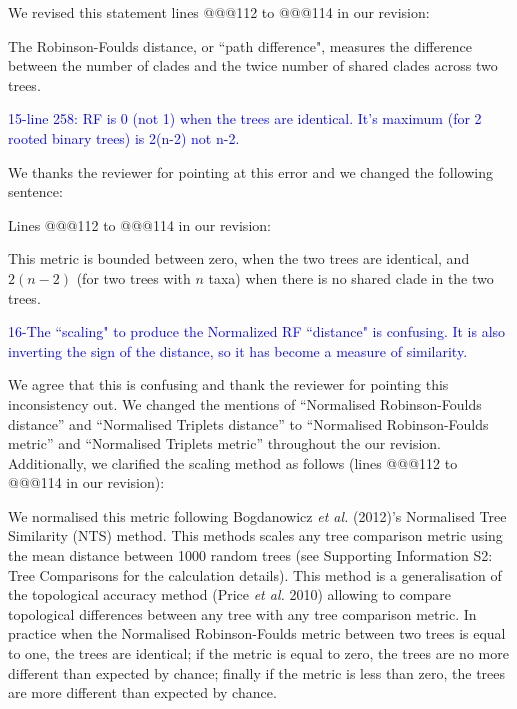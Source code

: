\documentclass[11pt]{letter}
\begin{document}
\begin{letter}{}
We revised this statement lines @@@112 to @@@114 in our revision:

\hfill\begin{minipage}{\dimexpr\textwidth-1cm}
The Robinson-Foulds distance, or ``path difference", measures the difference between the number of clades and the twice number of shared clades across two trees.
\end{minipage}


\textcolor{blue}{15-line 258: RF is 0 (not 1) when the trees are identical. It's maximum (for 2 rooted binary trees) is 2(n-2) not n-2.}

We thanks the reviewer for pointing at this error and we changed the following sentence:

Lines @@@112 to @@@114 in our revision:

\hfill\begin{minipage}{\dimexpr\textwidth-1cm}
This metric is bounded between zero, when the two trees are identical, and $2(n-2)$ (for two trees with $n$ taxa) when there is no shared clade in the two trees.
\end{minipage}


\textcolor{blue}{16-The ``scaling" to produce the Normalized RF ``distance" is confusing. It is also inverting the sign of the distance, so it has become a measure of similarity.}

We agree that this is confusing and thank the reviewer for pointing this inconsistency out. We changed the mentions of ``Normalised Robinson-Foulds distance'' and ``Normalised Triplets distance'' to ``Normalised Robinson-Foulds metric'' and ``Normalised Triplets metric'' throughout the our revision. Additionally, we clarified the scaling method as follows (lines @@@112 to @@@114 in our revision):

\hfill\begin{minipage}{\dimexpr\textwidth-1cm}
We normalised this metric following Bogdanowicz \textit{et al.} (2012)'s Normalised Tree Similarity (NTS) method. This methods scales %
any tree comparison metric using the mean distance between 1000 random trees (see Supporting Information S2: Tree Comparisons for the calculation details). This method is a generalisation of the topological accuracy method (Price \textit{et al.} 2010) allowing to compare topological differences between any tree with any tree comparison metric. In practice when the Normalised Robinson-Foulds metric between two trees is equal to one, the trees are identical; if the metric is equal to zero, the trees are no more different than expected by chance; finally if the metric is less than zero, the trees are more different than expected by chance.
\end{minipage}


\end{letter}
\end{document}
